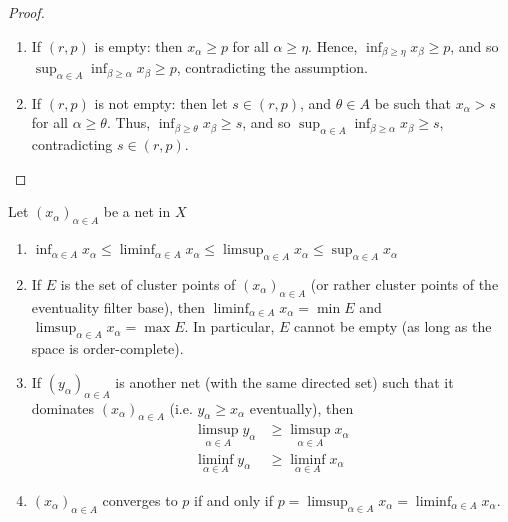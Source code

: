 \documentclass{treatise}
\begin{document}
\begin{proof}
\begin{enumerate}
    \item If $(r, p)$ is empty: then $x_\alpha \geq p$ for all $\alpha \geq \eta$. Hence, $\inf_{\beta \geq \eta} x_\beta \geq p$, and so $\sup_{\alpha \in A} \inf_{\beta \geq \alpha} x_\beta \geq p$, contradicting the assumption.
    \item If $(r, p)$ is not empty: then let $s \in (r, p)$, and $\theta \in A$ be such that $x_\alpha > s$ for all $\alpha \geq \theta$. Thus, $\inf_{\beta \geq \theta} x_\beta \geq s$, and so $\sup_{\alpha \in A} \inf_{\beta \geq \alpha} x_\beta \geq s$, contradicting $s \in (r, p)$.
\end{enumerate}
\end{proof}
\begin{proposition}
Let $(x_\alpha)_{\alpha \in A}$ be a net in $X$
\begin{enumerate}
    \item $\inf_{\alpha \in A} x_\alpha \leq \liminf_{\alpha \in A} x_\alpha \leq \limsup_{\alpha \in A} x_\alpha \leq \sup_{\alpha \in A} x_\alpha$
    \item If $E$ is the set of cluster points of $(x_\alpha)_{\alpha \in A}$ (or rather cluster points of the eventuality filter base), then $\liminf_{\alpha \in A} x_\alpha = \min E$ and $\limsup_{\alpha \in A} x_\alpha = \max E$. In particular, $E$ cannot be empty (as long as the space is order-complete).
    \item If $(y_\alpha)_{\alpha \in A}$ is another net (with the same directed set) such that it dominates $(x_\alpha)_{\alpha \in A}$ (i.e. $y_\alpha \geq x_\alpha$ eventually), then
    \begin{align*}
        \limsup_{\alpha \in A} y_\alpha & \geq \limsup_{\alpha \in A} x_\alpha
        \\
        \liminf_{\alpha \in A} y_\alpha & \geq \liminf_{\alpha \in A} x_\alpha
    \end{align*}
    \item $(x_\alpha)_{\alpha \in A}$ converges to $p$ if and only if $p = \limsup_{\alpha \in A} x_\alpha = \liminf_{\alpha \in A} x_\alpha$.
\end{enumerate}
\end{proposition}
\end{document}
